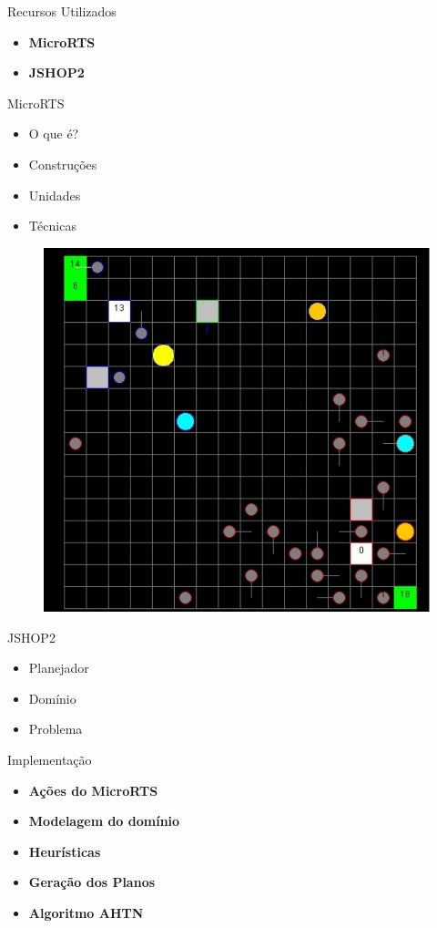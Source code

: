 \documentclass{beamer}
\begin{document}
{
	\begin{frame}{Recursos Utilizados}
		\vspace{5mm}
		\begin{itemize}
			\item \textbf{MicroRTS}
			\item \textbf{JSHOP2}
		\end{itemize}
	\end{frame}
}
\begin{frame}{MicroRTS}
	\begin{itemize}
		\item O que é?
		\item Construções
		\item Unidades
		\item Técnicas
	\end{itemize}
	\vspace{-3mm}
	\begin{figure}[here]
		\includegraphics[width=0.4\linewidth]{fig/microRTS.pdf}	
	\end{figure}	
\end{frame}
\begin{frame}{JSHOP2}
	\begin{itemize}
		\item Planejador
		\item Domínio
		\item Problema
	\end{itemize}
\end{frame}

{
	\begin{frame}{Implementação}
		\vspace{5mm}
		\begin{itemize}
			\item \textbf{Ações do MicroRTS}
			\item \textbf{Modelagem do domínio}
			\item \textbf{Heurísticas}
			\item \textbf{Geração dos Planos}
			\item \textbf{Algoritmo AHTN}
		\end{itemize}
	\end{frame}
}
\end{document}
